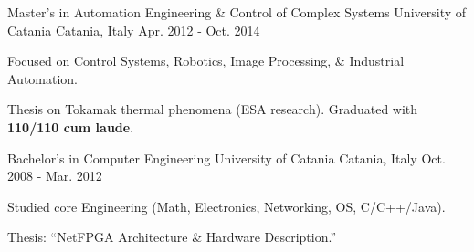 
\begin{cventries}

  \cventry
    {Master’s in Automation Engineering \& Control of Complex Systems} %
    {University of Catania} %
    {Catania, Italy} %
    {Apr. 2012 - Oct. 2014} %
    {
      \begin{cvitems}
        \item {Focused on Control Systems, Robotics, Image Processing, \& Industrial Automation.}
        \item {Thesis on Tokamak thermal phenomena (ESA research). Graduated with \textbf{110/110 cum laude}.}
      \end{cvitems}
    }

  \cventry
    {Bachelor’s in Computer Engineering} %
    {University of Catania} %
    {Catania, Italy} %
    {Oct. 2008 - Mar. 2012} %
    {
      \begin{cvitems}
        \item {Studied core Engineering (Math, Electronics, Networking, OS, C/C++/Java).}
        \item {Thesis: “NetFPGA Architecture \& Hardware Description.”}
      \end{cvitems}
    }

\end{cventries}
